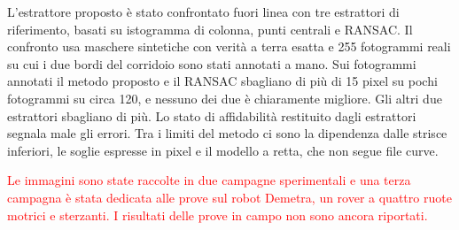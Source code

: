 L'estrattore proposto è stato confrontato fuori linea con tre estrattori di riferimento, basati su istogramma di colonna, punti centrali e RANSAC. Il confronto usa maschere sintetiche con verità a terra esatta e 255 fotogrammi reali su cui i due bordi del corridoio sono stati annotati a mano. Sui fotogrammi annotati il metodo proposto e il RANSAC sbagliano di più di 15 pixel su pochi fotogrammi su circa 120, e nessuno dei due è chiaramente migliore. Gli altri due estrattori sbagliano di più. Lo stato di affidabilità restituito dagli estrattori segnala male gli errori. Tra i limiti del metodo ci sono la dipendenza dalle strisce inferiori, le soglie espresse in pixel e il modello a retta, che non segue file curve.

\textcolor{red}{Le immagini sono state raccolte in due campagne sperimentali e una terza campagna è stata dedicata alle prove sul robot Demetra, un rover a quattro ruote motrici e sterzanti. I risultati delle prove in campo non sono ancora riportati.}
